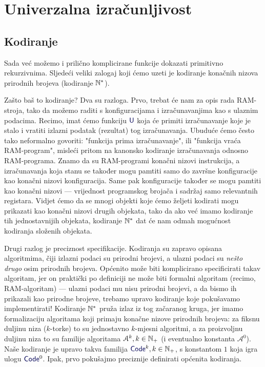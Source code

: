 \chapter{Univerzalna izračunljivost}\label{ch:univ}

\section{Kodiranje}

Sada već možemo i prilično komplicirane funkcije dokazati primitivno rekurzivnima. Sljedeći veliki zalogaj koji ćemo uzeti je kodiranje konačnih nizova prirodnih brojeva (kodiranje ${\mathbb N}^*$).

Zašto baš to kodiranje? Dva su razloga. Prvo, trebat će nam za opis rada RAM-stroja, tako da možemo raditi s konfiguracijama i izračunavanjima kao s ulaznim podacima. Recimo, imat ćemo funkciju $\f U$ koja će primiti izračunavanje koje je stalo i vratiti izlazni podatak (rezultat) tog izračunavanja. Ubuduće ćemo često tako neformalno govoriti: "funkcija prima izračunavanje", ili "funkcija vraća RAM-program", misleći  pritom na kanonsko kodiranje izračunavanja odnosno RAM-programa. Znamo da su RAM-programi konačni nizovi instrukcija, a izračunavanja koja stanu se također mogu pamtiti samo do završne konfiguracije kao konačni nizovi konfiguracija. Same pak konfiguracije također se mogu pamtiti kao konačni nizovi --- vrijednost programskog brojača i sadržaj samo relevantnih registara. Vidjet ćemo da se mnogi objekti koje ćemo željeti kodirati mogu prikazati kao konačni nizovi drugih objekata, tako da ako već imamo kodiranje tih jednostavnijih objekata, kodiranje ${\mathbb N}^*$ dat će nam odmah mogućnost kodiranja složenih objekata.

Drugi razlog je preciznost specifikacije. Kodiranja su zapravo opisana algoritmima, čiji izlazni podaci su prirodni brojevi, a ulazni podaci su \emph{nešto drugo} osim prirodnih brojeva. Općenito može biti komplicirano specificirati takav algoritam, jer on praktički po definiciji ne može biti formalni algoritam (recimo, RAM-algoritam) --- ulazni podaci mu nisu prirodni brojevi, a da bismo ih prikazali kao prirodne brojeve, trebamo upravo kodiranje koje pokušavamo implementirati! Kodiranje ${\mathbb N}^*$ pruža izlaz iz tog začaranog kruga, jer imamo formalizaciju algoritama koji primaju konačne nizove prirodnih brojeva: za fiksnu duljinu niza ($k$-torke) to su jednostavno $k$-mjesni algoritmi, a za proizvoljnu duljinu niza to su familije algoritama $\mathcal A^k,k\in{\mathbb N}_+$ (i eventualno konstanta $\mathcal A^0$). Naše kodiranje je upravo takva familija $\f{Code}^k,k\in\N_+$, s konstantom $1$ koja igra ulogu $\f{Code}^0$. Ipak, prvo pokušajmo preciznije definirati općenita kodiranja.


